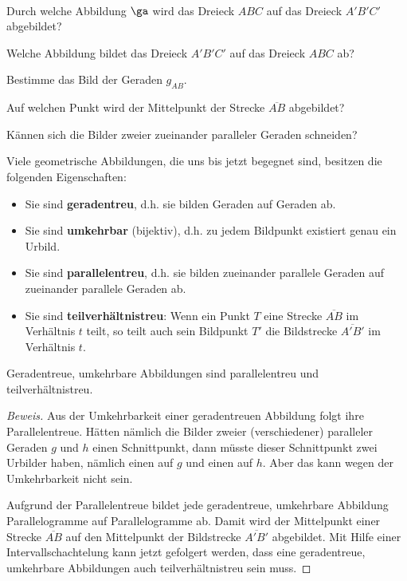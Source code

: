 \documentclass[%
11pt,%
twoside,%
titlepage,%
german,%
headsepline%
]{scrartcl}
\begin{document}
\begin{ueb}
\ \\[-4ex]
\begin{enumeratea}
\item Durch welche Abbildung $\ga$ wird das Dreieck $ABC$ auf das Dreieck $A'B'C'$ abgebildet?
\item Welche Abbildung bildet das Dreieck $A'B'C'$ auf das Dreieck $ABC$ ab?
\item Bestimme das Bild der Geraden $g_{AB}$.
\item Auf welchen Punkt wird der Mittelpunkt der Strecke $\overline{AB}$ abgebildet?
\item Kännen sich die Bilder zweier zueinander paralleler Geraden schneiden?
\end{enumeratea}
\end{ueb}

Viele geometrische Abbildungen, die uns bis jetzt begegnet sind, besitzen die folgenden Eigenschaften:
\begin{itemize}
\item Sie sind \textbf{geradentreu}, d.h. sie bilden Geraden auf Geraden ab.
\item Sie sind \textbf{umkehrbar} (bijektiv), d.h. zu jedem Bildpunkt existiert genau ein Urbild.
\item Sie sind \textbf{parallelentreu}, d.h. sie bilden zueinander parallele Geraden auf zueinander parallele Geraden ab.
\item Sie sind \textbf{teilverhältnistreu}: Wenn ein Punkt $T$ eine Strecke $\overline{AB}$ im Verhältnis $t$ teilt, so teilt auch sein Bildpunkt $T'$ die Bildstrecke $\overline{A'B'}$ im Verhältnis $t$.
\end{itemize}

\begin{satz}
Geradentreue, umkehrbare Abbildungen sind parallelentreu und teilverhältnistreu.
\end{satz}

\begin{proof}[Beweis]
Aus der Umkehrbarkeit einer geradentreuen Abbildung folgt ihre Parallelentreue. Hätten nämlich die Bilder zweier (verschiedener) paralleler Geraden $g$ und $h$ einen Schnittpunkt, dann müsste dieser Schnittpunkt zwei Urbilder haben, nämlich einen auf $g$ und einen auf $h$. Aber das kann wegen der Umkehrbarkeit nicht sein.

Aufgrund der Parallelentreue bildet jede geradentreue, umkehrbare Abbildung Parallelogramme auf Parallelogramme ab. Damit wird der Mittelpunkt einer Strecke $\overline{AB}$ auf den Mittelpunkt der Bildstrecke $\overline{A'B'}$ abgebildet. Mit Hilfe einer Intervallschachtelung kann jetzt gefolgert werden, dass eine geradentreue, umkehrbare Abbildungen auch teilverhältnistreu sein muss.
\end{proof}
\end{document}
